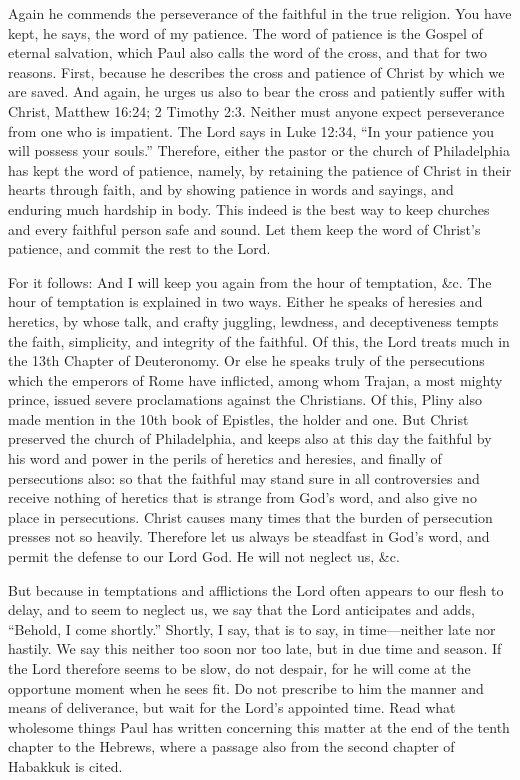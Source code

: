 Again he commends the perseverance of the faithful in the true religion. You have kept, he says, the word of my patience. The word of patience is the Gospel of eternal salvation, which Paul also calls the word of the cross, and that for two reasons. First, because he describes the cross and patience of Christ by which we are saved. And again, he urges us also to bear the cross and patiently suffer with Christ, Matthew 16:24; 2 Timothy 2:3. Neither must anyone expect perseverance from one who is impatient. The Lord says in Luke 12:34, “In your patience you will possess your souls.” Therefore, either the pastor or the church of Philadelphia has kept the word of patience, namely, by retaining the patience of Christ in their hearts through faith, and by showing patience in words and sayings, and enduring much hardship in body. This indeed is the best way to keep churches and every faithful person safe and sound. Let them keep the word of Christ’s patience, and commit the rest to the Lord.

For it follows: And I will keep you again from the hour of temptation, \&c. The hour of temptation is explained in two ways. Either he speaks of heresies and heretics, by whose talk, and crafty juggling, lewdness, and deceptiveness tempts the faith, simplicity, and integrity of the faithful. Of this, the Lord treats much in the 13th Chapter of Deuteronomy. Or else he speaks truly of the persecutions which the emperors of Rome have inflicted, among whom Trajan, a most mighty prince, issued severe proclamations against the Christians. Of this, Pliny also made mention in the 10th book of Epistles, the holder and one. But Christ preserved the church of Philadelphia, and keeps also at this day the faithful by his word and power in the perils of heretics and heresies, and finally of persecutions also: so that the faithful may stand sure in all controversies and receive nothing of heretics that is strange from God’s word, and also give no place in persecutions. Christ causes many times that the burden of persecution presses not so heavily. Therefore let us always be steadfast in God’s word, and permit the defense to our Lord God. He will not neglect us, \&c.

But because in temptations and afflictions the Lord often appears to our flesh to delay, and to seem to neglect us, we say that the Lord anticipates and adds, “Behold, I come shortly.” Shortly, I say, that is to say, in time—neither late nor hastily. We say this neither too soon nor too late, but in due time and season. If the Lord therefore seems to be slow, do not despair, for he will come at the opportune moment when he sees fit. Do not prescribe to him the manner and means of deliverance, but wait for the Lord’s appointed time. Read what wholesome things Paul has written concerning this matter at the end of the tenth chapter to the Hebrews, where a passage also from the second chapter of Habakkuk is cited.

